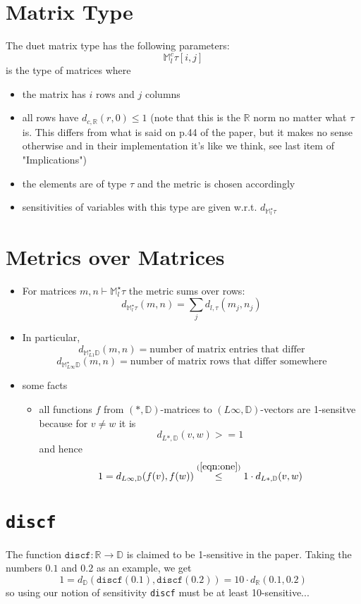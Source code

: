 \documentclass{article}
\begin{document}
\section*{Matrix Type}
The duet matrix type has the following parameters:
$$\mathbb{M}^c_l \tau[i,j]$$
is the type of matrices where
\begin{itemize}
   \item the matrix has $i$ rows and $j$ columns
   \item all rows have $d_{c,\mathbb{R}}(r,0) \leq 1$ (note that this is the $\mathbb{R}$ norm no matter what $\tau$ is. This differs from what is said on p.44 of the paper, but it makes no sense otherwise and in their implementation it's like we think, see last item of "Implications")
   \item the elements are of type $\tau$ and the metric is chosen accordingly
   \item sensitivities of variables with this type are given w.r.t. $d_{\mathbb{M}^\star_l\tau}$
\end{itemize}

\section*{Metrics over Matrices}
\begin{itemize}
\item For matrices $m,n \vdash \mathbb{M}^\star_l\tau$ the metric sums over rows:
      $$d_{\mathbb{M}^\star_l\tau}(m,n) = \sum_j d_{l,\tau}(m_j,n_j)$$
\item In particular,
$$d_{\mathbb{M}^\star_{L1}\mathbb{D}}(m,n) = \text{number of matrix entries that differ}$$
$$d_{\mathbb{M}^\star_{L\infty}\mathbb{D}}(m,n) = \text{number of matrix rows that differ somewhere}$$
\item some facts
   \begin{itemize}
      \item all functions $f$ from $(*,\mathbb{D})$-matrices to $(L\infty,\mathbb{D})$-vectors are 1-sensitve because for $v \neq w$ it is
         \[d_{L*, \mathbb{D}}(v,w) >= 1\]
         and hence
         \[1 = d_{L\infty, \mathbb{D}}(f(v),f(w)) \overset{(\ref{eqn:one})}{\leq} 1 \cdot d_{L*, \mathbb{D}}(v,w)\]
   \end{itemize}
\end{itemize}

\section*{\texttt{discf}}
The function $\texttt{discf} : \mathbb{R}\rightarrow\mathbb{D}$ is claimed to be 1-sensitive in the paper. Taking the numbers $0.1$ and $0.2$ as an example, we get
\[1 = d_{\mathbb{D}}(\texttt{discf}(0.1),\texttt{discf}(0.2)) = 10 \cdot d_{\mathbb{R}}(0.1,0.2)\]
so using our notion of sensitivity \texttt{discf} must be at least 10-sensitive...
\end{document}
